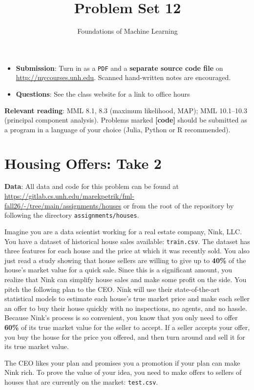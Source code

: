 \documentclass[letterpaper]{article}
\title{Problem Set 12}
\author{Foundations of Machine Learning}
\date{}
\begin{document}
\maketitle

\begin{itemize}
\item \textbf{Submission}: Turn in as a \texttt{PDF} and a \textbf{separate source code file} on \url{http://mycourses.unh.edu}. Scanned hand-written notes are encouraged.
\item \textbf{Questions}: See the class website for a link to office hours
\end{itemize}

\textbf{Relevant reading}: MML 8.1, 8.3 (maximum likelihood, MAP); MML 10.1--10.3 (principal component analysis). Problems marked \textbf{[code]} should be submitted as a program in a language of your choice (Julia, Python or R recommended). 

\section{Housing Offers: Take 2}

\textbf{Data}: All data and code for this problem can be found at \url{https://gitlab.cs.unh.edu/marekpetrik/fml-fall26/-/tree/main/assignments/houses} or from the root of the repository by following the directory \texttt{assignments/houses}.

Imagine you are a data scientist working for a real estate company, Nink, LLC. You have a dataset of historical house sales available: \texttt{train.csv}. The dataset has three features for each house and the price at which it was recently sold. You also just read a study showing that house sellers are willing to give up to \textbf{40\%} of the house's market value for a quick sale. Since this is a significant amount, you realize that Nink can simplify house sales and make some profit on the side. You pitch the following plan to the CEO. Nink will use their state-of-the-art statistical models to estimate each house’s true market price and make each seller an offer to buy their house quickly with no inspections, no agents, and no hassle. Because Nink's process is so convenient, you know that you only need to offer \textbf{60\%} of its true market value for the seller to accept. If a seller accepts your offer, you buy the house for the price you offered, and then turn around and sell it for its true market value.

The CEO likes your plan and promises you a promotion if your plan can make Nink rich. To prove the value of your idea, you need to make offers to sellers of houses that are currently on the market: \texttt{test.csv}.
\end{document}
